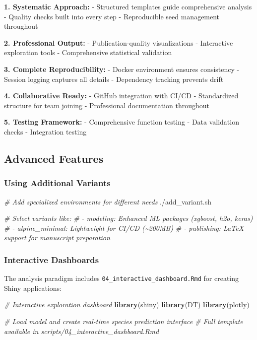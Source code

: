 \documentclass[
]{article}
\newenvironment{Shaded}{\begin{snugshade}}{\end{snugshade}}
\newcommand{\CommentTok}[1]{\textcolor[rgb]{0.56,0.35,0.01}{\textit{#1}}}
\newcommand{\ExtensionTok}[1]{#1}
\newcommand{\FunctionTok}[1]{\textcolor[rgb]{0.13,0.29,0.53}{\textbf{#1}}}
\newcommand{\NormalTok}[1]{#1}
\begin{document}
\textbf{1. Systematic Approach:} - Structured templates guide
comprehensive analysis - Quality checks built into every step -
Reproducible seed management throughout

\textbf{2. Professional Output:} - Publication-quality visualizations -
Interactive exploration tools - Comprehensive statistical validation

\textbf{3. Complete Reproducibility:} - Docker environment ensures
consistency - Session logging captures all details - Dependency tracking
prevents drift

\textbf{4. Collaborative Ready:} - GitHub integration with CI/CD -
Standardized structure for team joining - Professional documentation
throughout

\textbf{5. Testing Framework:} - Comprehensive function testing - Data
validation checks - Integration testing

\subsection{Advanced Features}\label{advanced-features}

\subsubsection{Using Additional
Variants}\label{using-additional-variants}

\begin{Shaded}
\begin{Highlighting}[]
\CommentTok{\# Add specialized environments for different needs}
\ExtensionTok{./add\_variant.sh}

\CommentTok{\# Select variants like:}
\CommentTok{\# {-} modeling: Enhanced ML packages (xgboost, h2o, keras)}
\CommentTok{\# {-} alpine\_minimal: Lightweight for CI/CD (\textasciitilde{}200MB)}
\CommentTok{\# {-} publishing: LaTeX support for manuscript preparation}
\end{Highlighting}
\end{Shaded}

\subsubsection{Interactive Dashboards}\label{interactive-dashboards}

The analysis paradigm includes \texttt{04\_interactive\_dashboard.Rmd}
for creating Shiny applications:

\begin{Shaded}
\begin{Highlighting}[]
\CommentTok{\# Interactive exploration dashboard}
\FunctionTok{library}\NormalTok{(shiny)}
\FunctionTok{library}\NormalTok{(DT)}
\FunctionTok{library}\NormalTok{(plotly)}

\CommentTok{\# Load model and create real{-}time species prediction interface}
\CommentTok{\# Full template available in scripts/04\_interactive\_dashboard.Rmd}
\end{Highlighting}
\end{Shaded}
\end{document}
